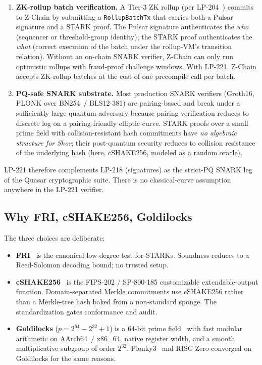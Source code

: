 \begin{enumerate}[leftmargin=2em,nosep]
\item \textbf{ZK-rollup batch verification.} A Tier-3 ZK rollup
  (per LP-204~\cite{lp204}) commits to Z-Chain by submitting a
  \texttt{RollupBatchTx} that carries both a Pulsar signature and a
  STARK proof. The Pulsar signature authenticates the \emph{who}
  (sequencer or threshold-group identity); the STARK proof
  authenticates the \emph{what} (correct execution of the batch
  under the rollup-VM's transition relation). Without an on-chain
  SNARK verifier, Z-Chain can only run optimistic rollups with
  fraud-proof challenge windows. With LP-221, Z-Chain accepts
  ZK-rollup batches at the cost of one precompile call per batch.
\item \textbf{PQ-safe SNARK substrate.} Most production SNARK
  verifiers (Groth16, PLONK over BN254~/ BLS12-381) are
  pairing-based and break under a sufficiently large quantum
  adversary because pairing verification reduces to discrete log on
  a pairing-friendly elliptic curve. STARK proofs over a small
  prime field with collision-resistant hash commitments have
  \emph{no algebraic structure for Shor}; their post-quantum
  security reduces to collision resistance of the underlying hash
  (here, cSHAKE256, modeled as a random oracle).
\end{enumerate}

LP-221 therefore complements LP-218 (signatures) as the strict-PQ
SNARK leg of the Quasar cryptographic suite. There is no
classical-curve assumption anywhere in the LP-221 verifier.

\subsection{Why FRI, cSHAKE256, Goldilocks}

The three choices are deliberate:

\begin{itemize}[leftmargin=2em,nosep]
\item \textbf{FRI}~\cite{frieprint,starkeprint} is the canonical
  low-degree test for STARKs. Soundness reduces to a Reed-Solomon
  decoding bound; no trusted setup.
\item \textbf{cSHAKE256}~\cite{fips202,sp800185} is the FIPS-202
  / SP-800-185 customizable extendable-output function.
  Domain-separated Merkle commitments use cSHAKE256 rather than a
  Merkle-tree hash baked from a non-standard sponge. The
  standardization gates conformance and audit.
\item \textbf{Goldilocks} ($p = 2^{64} - 2^{32} + 1$) is a 64-bit
  prime field~\cite{goldilocks} with fast modular arithmetic on
  AArch64~/ x86\_64, native register width, and a smooth
  multiplicative subgroup of order $2^{32}$. Plonky3~\cite{plonky3}
  and RISC Zero converged on Goldilocks for the same reasons.
\end{itemize}


